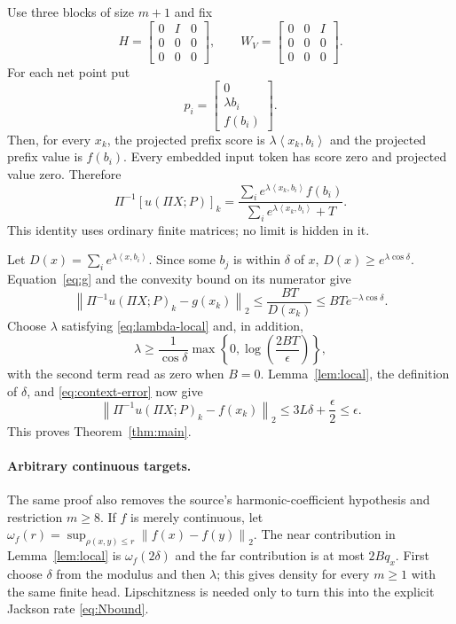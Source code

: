 \documentclass[11pt]{article}
\newcommand{\norm}[1]{\left\lVert #1\right\rVert}
\newcommand{\ip}[2]{\left\langle #1,#2\right\rangle}
\begin{document}
Use three blocks of size $m+1$ and fix
\begin{equation}\label{eq:matrices}
 H=\begin{bmatrix}0&I&0\\0&0&0\\0&0&0\end{bmatrix},
 \qquad
 W_V=\begin{bmatrix}0&0&I\\0&0&0\\0&0&0\end{bmatrix}.
\end{equation}
For each net point put
\begin{equation}\label{eq:prefix}
 p_i=\begin{bmatrix}0\\ \lambda b_i\\ f(b_i)\end{bmatrix}.
\end{equation}
Then, for every $x_k$, the projected prefix score is
$\lambda\ip{x_k}{b_i}$ and the projected prefix value is $f(b_i)$.  Every
embedded input token has score zero and projected value zero.  Therefore
\begin{equation}\label{eq:exact-head}
 \Pi^{-1}[u(\Pi X;P)]_k
 =\frac{\sum_i e^{\lambda\ip{x_k}{b_i}}f(b_i)}
        {\sum_i e^{\lambda\ip{x_k}{b_i}}+T}.
\end{equation}
This identity uses ordinary finite matrices; no limit is hidden in it.

Let $D(x)=\sum_i e^{\lambda\ip{x}{b_i}}$.  Since some $b_j$ is within
$\delta$ of $x$, $D(x)\ge e^{\lambda\cos\delta}$.  Equation~\eqref{eq:g} and
the convexity bound on its numerator give
\begin{equation}\label{eq:context-error}
 \norm{\Pi^{-1}u(\Pi X;P)_k-g(x_k)}_2
 \le \frac{BT}{D(x_k)}
 \le BT e^{-\lambda\cos\delta}.
\end{equation}
Choose $\lambda$ satisfying \eqref{eq:lambda-local} and, in addition,
\begin{equation}\label{eq:lambda-context}
 \lambda\ge \frac{1}{\cos\delta}
 \max\left\{0,\log\left(\frac{2BT}{\epsilon}\right)\right\},
\end{equation}
with the second term read as zero when $B=0$.  Lemma~\ref{lem:local}, the
definition of $\delta$, and \eqref{eq:context-error} now give
\[
 \norm{\Pi^{-1}u(\Pi X;P)_k-f(x_k)}_2
 \le3L\delta+\frac\epsilon2\le\epsilon.
\]
This proves Theorem~\ref{thm:main}.

\paragraph{Arbitrary continuous targets.}
The same proof also removes the source's harmonic-coefficient hypothesis and
restriction $m\ge8$.  If $f$ is merely continuous, let
$\omega_f(r)=\sup_{\rho(x,y)\le r}\norm{f(x)-f(y)}_2$.  The near contribution
in Lemma~\ref{lem:local} is $\omega_f(2\delta)$ and the far contribution is at
most $2Bq_x$.  First choose $\delta$ from the modulus and then $\lambda$; this
gives density for every $m\ge1$ with the same finite head.  Lipschitzness is
needed only to turn this into the explicit Jackson rate \eqref{eq:Nbound}.
\end{document}
